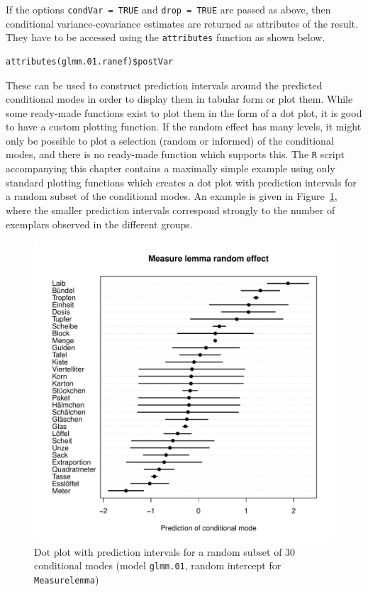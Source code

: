 If the options \texttt{condVar = TRUE} and \texttt{drop = TRUE} are passed as above, then conditional variance-covariance estimates are returned as attributes of the result.
They have to be accessed using the \texttt{attributes} function as shown below.

\vspace{0.5\baselineskip}

\begin{lstlisting}
attributes(glmm.01.ranef)$postVar
\end{lstlisting}

These can be used to construct prediction intervals around the predicted conditional modes in order to display them in tabular form or plot them.
While some ready-made functions exist to plot them in the form of a dot plot, it is good to have a custom plotting function.
If the random effect has many levels, it might only be possible to plot a selection (random or informed) of the conditional modes, and there is no ready-made function which supports this.
The \texttt{R} script accompanying this chapter contains a maximally simple example using only standard plotting functions which creates a dot plot with prediction intervals for a random subset of the conditional modes.
An example is given in Figure~\ref{fig:condmodes}, where the smaller prediction intervals correspond strongly to the number of exemplars observed in the different groups.

\begin{figure}
  \centering
  \includegraphics[width=\textwidth]{RPHCL/ranef_selection}
  \caption{Dot plot with prediction intervals for a random subset of 30 conditional modes (model \texttt{glmm.01}, random intercept for \texttt{Measurelemma})}
  \label{fig:condmodes}
\end{figure}

